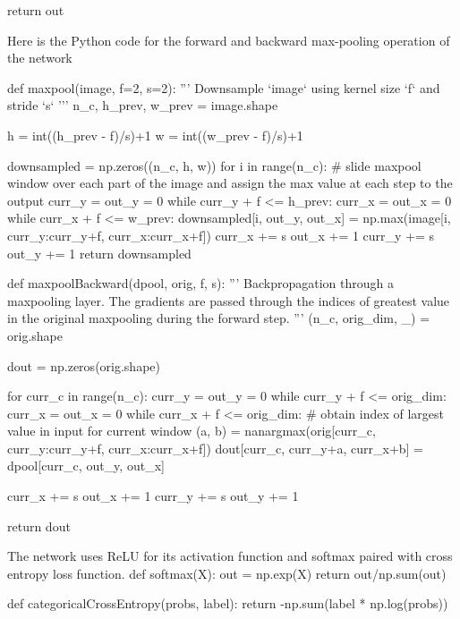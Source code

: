     return out
\stoptyping
\stopsubsection

\startsubsection[title=Max pooling]
Here is the Python code for the forward and backward max-pooling operation of the network

\starttyping
def maxpool(image, f=2, s=2):
    '''
    Downsample `image` using kernel size `f` and stride `s`
    '''
    n_c, h_prev, w_prev = image.shape
    
    h = int((h_prev - f)/s)+1
    w = int((w_prev - f)/s)+1
    
    downsampled = np.zeros((n_c, h, w))
    for i in range(n_c):
        # slide maxpool window over each part of the image and assign the max value at each step to the output
        curr_y = out_y = 0
        while curr_y + f <= h_prev:
            curr_x = out_x = 0
            while curr_x + f <= w_prev:
                downsampled[i, out_y, out_x] = np.max(image[i, curr_y:curr_y+f, curr_x:curr_x+f])
                curr_x += s
                out_x += 1
            curr_y += s
            out_y += 1
    return downsampled
\stoptyping

\starttyping
def maxpoolBackward(dpool, orig, f, s):
    '''
    Backpropagation through a maxpooling layer. The gradients are passed through the indices of greatest value in the original maxpooling during the forward step.
    '''
    (n_c, orig_dim, _) = orig.shape
    
    dout = np.zeros(orig.shape)
    
    for curr_c in range(n_c):
        curr_y = out_y = 0
        while curr_y + f <= orig_dim:
            curr_x = out_x = 0
            while curr_x + f <= orig_dim:
                # obtain index of largest value in input for current window
                (a, b) = nanargmax(orig[curr_c, curr_y:curr_y+f, curr_x:curr_x+f])
                dout[curr_c, curr_y+a, curr_x+b] = dpool[curr_c, out_y, out_x]
                
                curr_x += s
                out_x += 1
            curr_y += s
            out_y += 1
        
    return dout
\stoptyping
\stopsubsection

\startsubsection[title=Various functions]
The network uses ReLU for its activation function and softmax paired with cross entropy loss function.
\starttyping
def softmax(X):
    out = np.exp(X)
    return out/np.sum(out)

def categoricalCrossEntropy(probs, label):
    return -np.sum(label * np.log(probs))
\stoptyping
\stopsubsection

